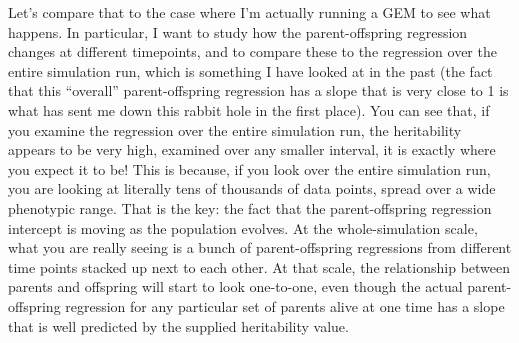 \documentclass[12pt,reqno,final,pdftex]{amsart}\usepackage[]{graphicx}\usepackage[]{color}
\theoremstyle{plain}
\numberwithin{equation}{part}
\begin{document}
Let's compare that to the case where I'm actually running a GEM to see what happens.
In particular, I want to study how the parent-offspring regression changes at different timepoints, and to compare these to the regression over the entire simulation run, which is something I have looked at in the past (the fact that this ``overall'' parent-offspring regression has a slope that is very close to 1 is what has sent me down this rabbit hole in the first place).
You can see that, if you examine the regression over the entire simulation run, the heritability appears to be very high, examined over any smaller interval, it is exactly where you expect it to be!
This is because, if you look over the entire simulation run, you are looking at literally tens of thousands of data points, spread over a wide phenotypic range.
That is the key: the fact that the parent-offspring regression intercept is moving as the population evolves.
At the whole-simulation scale, what you are really seeing is a bunch of parent-offspring regressions from different time points stacked up next to each other.
At that scale, the relationship between parents and offspring will start to look one-to-one, even though the actual parent-offspring regression for any particular set of parents alive at one time has a slope that is well predicted by the supplied heritability value.
\end{document}
